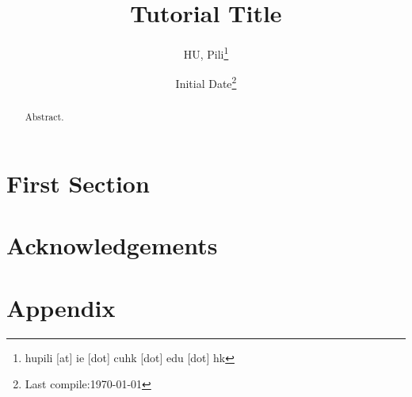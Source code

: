 



\author{HU, Pili\thanks{hupili [at] ie [dot] cuhk [dot] edu [dot] hk}}

\title{Tutorial Title}
\date{Initial Date\thanks{Last compile:\today}}



\maketitle
\begin{abstract}
	Abstract. 
\end{abstract}

\pagebreak
\setcounter{tocdepth}{2}
\tableofcontents
\pagebreak



\section{First Section}






\section*{Acknowledgements}




\section*{Appendix}



